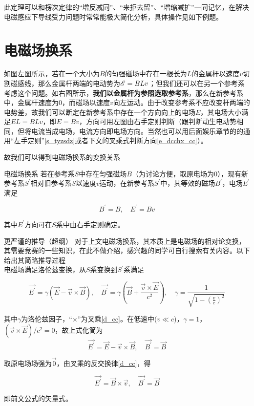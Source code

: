 此定理可以和楞次定律的“增反减同”、“来拒去留”、“增缩减扩”一同记忆，在解决电磁感应下导线受力问题时常常能极大简化分析，具体操作见如下例题。

\section{电磁场换系}



如图左图所示，若在一个大小为$B$的匀强磁场中存在一根长为$L$的金属杆以速度$v$切割磁感线，那么金属杆两端的电动势为$\mathscr{E} = B L v$；但我们还可以在另一个参考系考虑这个问题。如右图所示，\textbf{我们以金属杆为参照选取参考系}，那么在新参考系中，金属杆速度为$0$，而磁场以速度$v$向左运动。由于改变参考系不应改变杆两端的电势差，故我们可以断定在新参考系中存在一个方向向上的电场$E$，其电场大小满足$E L = B L v$，即$E = B v$，方向可用左图由右手定则判断（跟判断动生电动势相同，但将电流当成电场，电流方向即电场方向。当然也可以用后面娱乐章节的的通用“左手定则”\eqref{s_tyzsdz}或者下文的叉乘式判断方向\eqref{e_dcchx_cc}）。

故我们可以得到电磁场换系的变换关系

\begin{theo}{电磁场换系}{}
若在参考系$S$中存在匀强磁场$B$（为讨论方便，取原电场为0），现有新参考系$S^{\prime}$相对旧参考系$S$以速度$v$运动，在新参考系$S^{\prime}$中，其等效的磁场$B^{\prime}$，电场$E^{\prime}$满足

$$B^{\prime} = B, \quad E^{\prime} = B v$$

其中$E^{\prime}$方向可在$S$系中由右手定则确定。

\end{theo}

\begin{mk}{更严谨的推导（超纲）}{}
对于上文电磁场换系，其本质上是电磁场的相对论变换，其需要竞赛的一些知识，在此不做介绍，感兴趣的同学可自行搜索有关内容。以下给出其简略推导过程
~\\

电磁场满足洛伦兹变换，从$S$系变换到$S^{\prime}$系满足

$$\vec{E^{\prime}} = \gamma (\vec{E} - \vec{v} \times \vec{B}), \quad \vec{B^{\prime}} = \gamma (\vec{B} +\frac{\vec{v} \times \vec{E}}{c^2}), \quad \gamma = \frac{1}{\sqrt{1-(\frac{v}{c})^2}}$$

其中$\gamma$为洛伦兹因子，“$\times$”为叉乘\eqref{d_cc}。在低速中($v \ll c$)，$\gamma = 1$，$(\vec{v} \times \vec{E})/c^2 = 0$，故上式化简为
$$\vec{E^{\prime}} = \vec{E} - \vec{v} \times \vec{B}, \quad \vec{B^{\prime}} = \vec{B}$$

取原电场场强为$\vec{0}$，由叉乘的反交换律\eqref{d_cc}，得

\begin{equation}
\label{e_dcchx_cc}
\boxed{\vec{E^{\prime}} = \vec{B} \times \vec{v}, \quad \vec{B^{\prime}} = \vec{B}}
\end{equation}

即前文公式的矢量式。
\end{mk}

